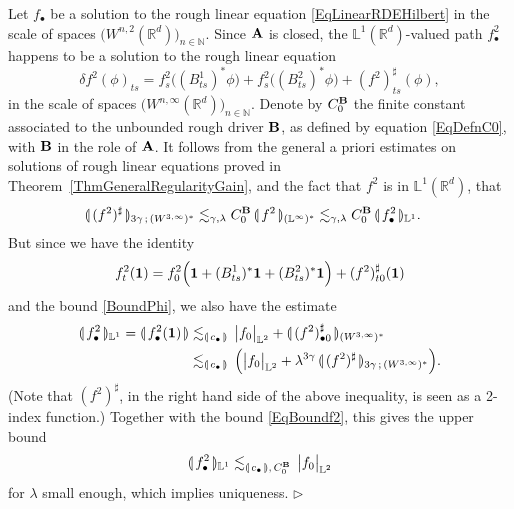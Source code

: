 \documentclass[11pt,a4paper]{amsart}
\newcommand{\NN}{\mathbb{N}}  \newcommand{\ZZ}{\mathbb{Z}}  \newcommand{\QQ}{\mathbb{Q}}  \newcommand{\HH}{\mathbb{H}}
\newcommand{\RR}{\mathbb{R}}  \newcommand{\CC}{\mathbb{C}}  \newcommand{\LL}{\mathbb{L}}  \newcommand{\WW}{\mathbb{W}}
\numberwithin{equation}{section} %
\newenvironment{Dem}{%
    \begin{list}{\hspace{0.5cm}{\sc Proof --}}{%
        \setlength{\topsep}{0pt}%
        \setlength{\leftmargin}{0pt}%
        \setlength{\rightmargin}{0pt}%
        \setlength{\listparindent}{0pt}%
        \setlength{\itemindent}{0pt}%
        \setlength{\parsep}{0pt}%
        \addtolength{\leftmargin}{20pt}%
        \addtolength{\rightmargin}{0pt}%
    } \item }{\hfill{\space $\rhd$}\end{list}\smallskip}
\begin{document}
\begin{Dem}
\noindent Let $f_\bullet$ be a solution to the rough linear equation \eqref{EqLinearRDEHilbert} in the scale of spaces $\big(W^{n,2}(\RR^d)\big)_{n\in\NN}$. Since $\bf A$ is closed, the $\LL^1(\RR^d)$-valued path $f^2_\bullet$ happens to be a solution to the rough linear equation
\begin{equation*} 
\delta f^2(\phi)_{ts} = f^2_s\big((B^1_{ts})^*\phi\big) + f^2_s\big((B^2_{ts})^*\phi\big) + (f^2)^\sharp_{ts}(\phi),
\end{equation*}
in the scale of spaces $\big(W^{n,\infty}(\RR^d)\big)_{n\in\NN}$. Denote by $C_0^{\bf B}$ the finite constant associated to the unbounded rough driver $\bf B$, as defined by equation \eqref{EqDefnC0}, with $\bf B$ in the role of $\bf A$. It follows from the general a priori estimates on solutions of rough linear equations proved in Theorem~\ref{ThmGeneralRegularityGain}, and the fact that $f^2$ is in $\LL^1(\RR^d)$, that 
\begin{equation}
\label{EqBoundf2}
\begin{split}
\llparenthesis\, (f^2)^\sharp \,\rrparenthesis_{3\gamma\,;\,(W^{3,\infty})^*} &\lesssim_{\gamma,\lambda}C_0^{\bf B}\,\llparenthesis\, f^2 \,\rrparenthesis_{(\LL^\infty)^*} 
\lesssim _{\gamma,\lambda} C_0^{\bf B}\,\llparenthesis\, f^2_\bullet \,\rrparenthesis_{\LL^1}.
\end{split}
\end{equation}
But since we have the identity 
$$
f^2_t({\bf 1}) = f_0^2\Big({\bf 1} + (B^1_{ts})^*{\bf 1} + (B^2_{ts})^*{\bf 1}\Big) + (f^2)^\sharp_{t0}({\bf  1})
$$
and the bound \eqref{BoundPhi}, we also have the estimate
\begin{equation*}
\begin{split}
\llparenthesis\, f^2_\bullet \,\rrparenthesis_{\LL^1} = \llparenthesis\, f^2_\bullet({\bf 1}) \,\rrparenthesis &\lesssim_{\llparenthesis\,c_\bullet\,\rrparenthesis} \,\big| f_0 \big|_{\LL^2} + \llparenthesis\, (f^2)^\sharp_{\bullet 0} \,\rrparenthesis_{(W^{3,\infty})^*}  \\
&\lesssim_{\llparenthesis\,c_\bullet\,\rrparenthesis} \, \Big( \big| f_0 \big|_{\LL^2} + \lambda^{3\gamma}\,\llparenthesis\, (f^2)^\sharp \,\rrparenthesis_{3\gamma\,;\,(W^{3,\infty})^*} \Big).
\end{split}
\end{equation*}
(Note that $(f^2)^\sharp$, in the right hand side of the above inequality, is seen as a 2-index function.) Together with the bound \eqref{EqBoundf2}, this gives the upper bound
$$
\llparenthesis\, f^2_\bullet \,\rrparenthesis_{\LL^1} \lesssim_{\llparenthesis\,c_\bullet\,\rrparenthesis,\,C_0^{\bf B}} \,\big| f_0 \big|_{\LL^2}
$$
for $\lambda$ small enough, which implies uniqueness.
\end{Dem}
\end{document}
